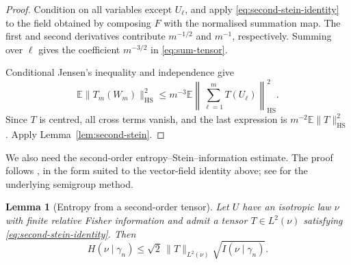 \documentclass[11pt]{amsart}
\numberwithin{equation}{section}
\newtheorem{lemma}[theorem]{Lemma}
\theoremstyle{definition}
\theoremstyle{remark}
\newcommand{\E}{\mathbb E}
\newcommand{\gam}{\gamma_n}
\newcommand{\HS}{\mathrm{HS}}
\newcommand{\norm}[1]{\lVert #1\rVert}
\begin{document}
\begin{proof}
Condition on all variables except \(U_\ell\), and apply
\eqref{eq:second-stein-identity} to the field obtained by composing \(F\)
with the normalised summation map. The first and second derivatives
contribute \(m^{-1/2}\) and \(m^{-1}\), respectively. Summing over
\(\ell\) gives the coefficient \(m^{-3/2}\) in
\eqref{eq:sum-tensor}.

Conditional Jensen's inequality and independence give
\[
\E\norm{T_m(W_m)}_{\HS}^2
\le m^{-3}\E\left\|\sum_{\ell=1}^m T(U_\ell)\right\|_{\HS}^2.
\]
Since \(T\) is centred, all cross terms vanish, and the last expression
is \(m^{-2}\E\norm T_{\HS}^2\). Apply
Lemma~\ref{lem:second-stein}.
\end{proof}

We also need the second-order entropy--Stein--information estimate. The
proof follows \cite[Theorem~3.1 and Lemma~3.2]{Fathi21}, in the form
suited to the vector-field identity above; see \cite{LNP15} for the
underlying semigroup method.

\begin{lemma}[Entropy from a second-order tensor]\label{lem:hsi}
Let \(U\) have an isotropic law \(\nu\) with finite relative Fisher
information and admit a tensor \(T\in L^2(\nu)\) satisfying
\eqref{eq:second-stein-identity}. Then
\begin{equation}\label{eq:hsi}
H(\nu\mid\gam)
\le\sqrt2\,\norm T_{L^2(\nu)}\sqrt{I(\nu\mid\gam)}.
\end{equation}
\end{lemma}
\end{document}
